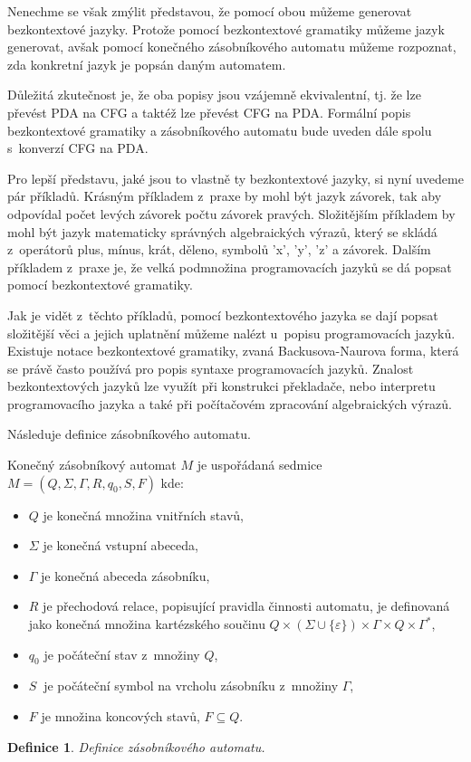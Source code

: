 Nenechme se však zmýlit představou, že pomocí obou můžeme generovat bezkontextové jazyky. Protože pomocí bezkontextové gramatiky můžeme jazyk generovat, avšak pomocí konečného zásobníkového automatu můžeme rozpoznat, zda konkretní jazyk je popsán daným automatem. 

Důležitá zkutečnost je, že oba popisy jsou vzájemně ekvivalentní, tj. že lze převést PDA na CFG a taktéž lze převést CFG na PDA. Formální popis bezkontextové gramatiky a zásobníkového automatu bude uveden dále spolu s~konverzí CFG na PDA. 

Pro lepší představu, jaké jsou to vlastně ty bezkontextové jazyky, si nyní uvedeme pár příkladů. Krásným příkladem z~praxe by mohl být jazyk závorek, tak aby odpovídal počet levých závorek počtu závorek pravých. Složitějším příkladem by mohl být jazyk matematicky správných algebraických výrazů, který se skládá z~operátorů plus, mínus, krát, děleno, symbolů 'x', 'y', 'z' a závorek. Dalším příkladem z~praxe je, že velká podmnožina programovacích jazyků se dá popsat pomocí bezkontextové gramatiky. 

Jak je vidět z~těchto příkladů, pomocí bezkontextového jazyka se dají popsat složitější věci a jejich uplatnění můžeme nalézt u~popisu programovacích jazyků. Existuje notace bezkontextové gramatiky, zvaná Backusova-Naurova forma, která se právě často používá pro popis syntaxe programovacích jazyků. Znalost bezkontextových jazyků lze využít při konstrukci překladače, nebo interpretu programovacího jazyka a také při počítačovém zpracování algebraických výrazů. \cite{CFL}

\newtheorem{mydef}{Definice}
\newtheorem{myAlgorithm}{Algoritmus}

Následuje definice zásobníkového automatu. \cite{PDA}

\begin{framed}
	\begin{flushleft}Konečný zásobníkový automat \( M \) je uspořádaná sedmice \( M = (Q, \Sigma, \Gamma, R, q_0, S, F) \) kde:\end{flushleft}
	\begin{itemize}
		\item \( Q \) je konečná množina vnitřních stavů,
		\item \( \Sigma \) je konečná vstupní abeceda,
		\item \( \Gamma \) je konečná abeceda zásobníku,
		\item \( R \) je přechodová relace, popisující pravidla činnosti automatu, je definovaná jako konečná množina kartézského součinu \( Q \times (\Sigma \cup \{\varepsilon\} ) \times \Gamma \times Q \times \Gamma^* \),
		\item \( q_0 \) je počáteční stav z~množiny \( Q \),
		\item \( S~\) je počáteční symbol na vrcholu zásobníku z~množiny \( \Gamma \),
		\item \( F \) je množina koncových stavů, \( F \subseteq Q \).
	\end{itemize}
\end{framed}
\begin{mydef}
	Definice zásobníkového automatu.
\end{mydef}

